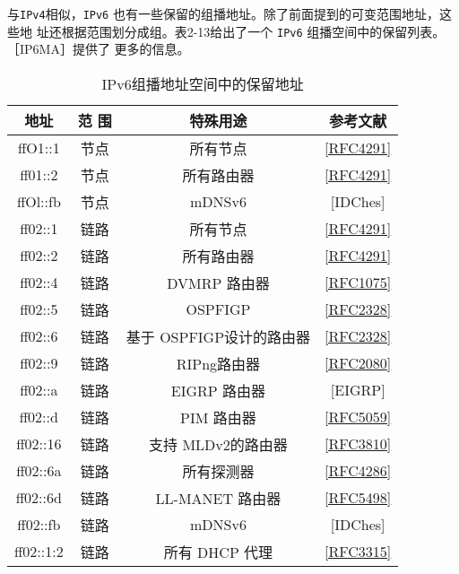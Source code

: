与\verb|IPv4|相似，\verb|IPv6| 也有一些保留的组播地址。除了前面提到的可变范围地址，这些地
址还根据范围划分成组。表2-13给出了一个 \verb|IPv6| 组播空间中的保留列表。［IP6MA］提供了
更多的信息。
\begin{table}[H]
    \centering
    \caption{IPv6组播地址空间中的保留地址}
    \begin{tabular}{c|c|c|c}
    \hline
        地址	&	范 围	&	特殊用途	&	参考文献 \\ \hline
        ffO1::1	&	节点	&	所有节点	&	\href{https://www.rfc-editor.org/rfc/rfc4291}{[RFC4291]} \\ \hline
        ff01::2	&	节点	&	所有路由器	&	\href{https://www.rfc-editor.org/rfc/rfc4291}{[RFC4291]} \\ \hline
        ffOl::fb	&	节点	&	mDNSv6	&	[IDChes] \\ \hline
        ff02::1	&	链路	&	所有节点	&	\href{https://www.rfc-editor.org/rfc/rfc4291}{[RFC4291]} \\ \hline
        ff02::2	&	链路	&	所有路由器	&	\href{https://www.rfc-editor.org/rfc/rfc4291}{[RFC4291]} \\ \hline
        ff02::4	&	链路	&	DVMRP 路由器	&	\href{https://www.rfc-editor.org/rfc/rfc1075}{[RFC1075]} \\ \hline
        ff02::5	&	链路	&	OSPFIGP	&	\href{https://www.rfc-editor.org/rfc/rfc2328}{[RFC2328]} \\ \hline
        ff02::6	&	链路	&	基于 OSPFIGP设计的路由器	&	\href{https://www.rfc-editor.org/rfc/rfc2328}{[RFC2328]} \\ \hline
        ff02::9	&	链路	&	RIPng路由器	&	\href{https://www.rfc-editor.org/rfc/rfc2080}{[RFC2080]} \\ \hline
        ff02::a	&	链路	&	EIGRP 路由器	&	[EIGRP] \\ \hline
        ff02::d	&	链路	&	PIM 路由器	&	\href{https://www.rfc-editor.org/rfc/rfc5059}{[RFC5059]} \\ \hline
        ff02::16	&	链路	&	支持 MLDv2的路由器	&	\href{https://www.rfc-editor.org/rfc/rfc3810}{[RFC3810]} \\ \hline
        ff02::6a	&	链路	&	所有探测器	&	\href{https://www.rfc-editor.org/rfc/rfc4286}{[RFC4286]} \\ \hline
        ff02::6d	&	链路	&	LL-MANET 路由器	&	\href{https://www.rfc-editor.org/rfc/rfc5498}{[RFC5498]} \\ \hline
        ff02::fb	&	链路	&	mDNSv6	&	[IDChes] \\ \hline
        ff02::1:2	&	链路	&	所有 DHCP 代理	&	\href{https://www.rfc-editor.org/rfc/rfc3315}{[RFC3315]} \\ \hline

\end{tabular}
\end{table}
